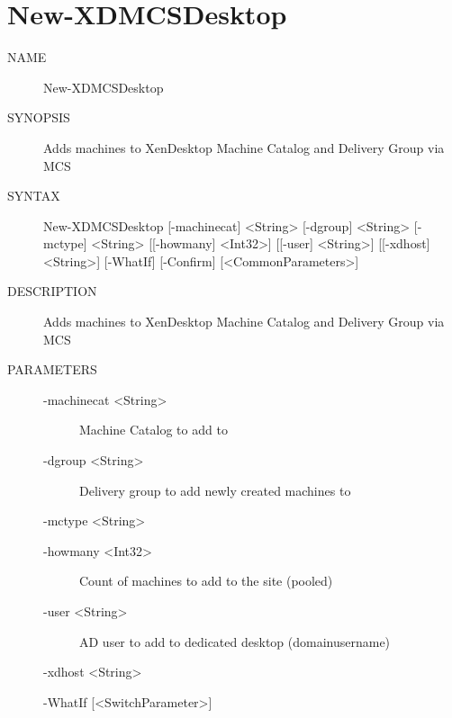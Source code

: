 \documentclass[letterpaper,10pt,english]{sphinxmanual}
\begin{document}
\section{New-XDMCSDesktop}
\label{\detokenize{cmd_new:new-xdmcsdesktop}}\begin{description}
\item[{NAME}] \leavevmode
New-XDMCSDesktop

\item[{SYNOPSIS}] \leavevmode
Adds machines to XenDesktop Machine Catalog and Delivery Group via MCS

\item[{SYNTAX}] \leavevmode
New-XDMCSDesktop {[}-machinecat{]} \textless{}String\textgreater{} {[}-dgroup{]} \textless{}String\textgreater{} {[}-mctype{]} \textless{}String\textgreater{} {[}{[}-howmany{]} \textless{}Int32\textgreater{}{]} {[}{[}-user{]} \textless{}String\textgreater{}{]} {[}{[}-xdhost{]} \textless{}String\textgreater{}{]} {[}-WhatIf{]} {[}-Confirm{]} {[}\textless{}CommonParameters\textgreater{}{]}

\item[{DESCRIPTION}] \leavevmode
Adds machines to XenDesktop Machine Catalog and Delivery Group via MCS

\item[{PARAMETERS}] \leavevmode\begin{description}
\item[{-machinecat \textless{}String\textgreater{}}] \leavevmode
Machine Catalog to add to

\item[{-dgroup \textless{}String\textgreater{}}] \leavevmode
Delivery group to add newly created machines to

\end{description}

-mctype \textless{}String\textgreater{}
\begin{description}
\item[{-howmany \textless{}Int32\textgreater{}}] \leavevmode
Count of machines to add to the site (pooled)

\item[{-user \textless{}String\textgreater{}}] \leavevmode
AD user to add to dedicated desktop (domainusername)

\end{description}

-xdhost \textless{}String\textgreater{}

-WhatIf {[}\textless{}SwitchParameter\textgreater{}{]}


\end{description}
\end{document}
